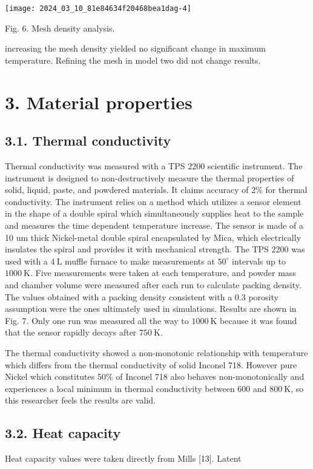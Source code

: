 \documentclass[10pt]{article}
\begin{document}
\begin{center}
\texttt{[image: 2024\_03\_10\_81e84634f20468bea1dag-4]}
\end{center}

Fig. 6. Mesh density analysis.

increasing the mesh density yielded no significant change in maximum temperature. Refining the mesh in model two did not change results.

\section*{3. Material properties}
\subsection*{3.1. Thermal conductivity}
Thermal conductivity was measured with a TPS 2200 scientific instrument. The instrument is designed to non-destructively measure the thermal properties of solid, liquid, paste, and powdered materials. It claims accuracy of $2 \%$ for thermal conductivity. The instrument relies on a method which utilizes a sensor element in the shape of a double spiral which simultaneously supplies heat to the sample and measures the time dependent temperature increase. The sensor is made of a 10 um thick Nickel-metal double spiral encapsulated by Mica, which electrically insulates the spiral and provides it with mechanical strength. The TPS 2200 was used with a $4 \mathrm{~L}$ muffle furnace to make measurements at $50^{\circ}$ intervals up to $1000 \mathrm{~K}$. Five measurements were taken at each temperature, and powder mass and chamber volume were measured after each run to calculate packing density. The values obtained with a packing density consistent with a 0.3 porosity assumption were the ones ultimately used in simulations. Results are shown in Fig. 7. Only one run was measured all the way to $1000 \mathrm{~K}$ because it was found that the sensor rapidly decays after $750 \mathrm{~K}$.

The thermal conductivity showed a non-monotonic relationship with temperature which differs from the thermal conductivity of solid Inconel 718. However pure Nickel which constitutes 50\% of Inconel 718 also behaves non-monotonically and experiences a local minimum in thermal conductivity between 600 and $800 \mathrm{~K}$, so this researcher feels the results are valid.

\subsection*{3.2. Heat capacity}
Heat capacity values were taken directly from Mills [13]. Latent
\end{document}
